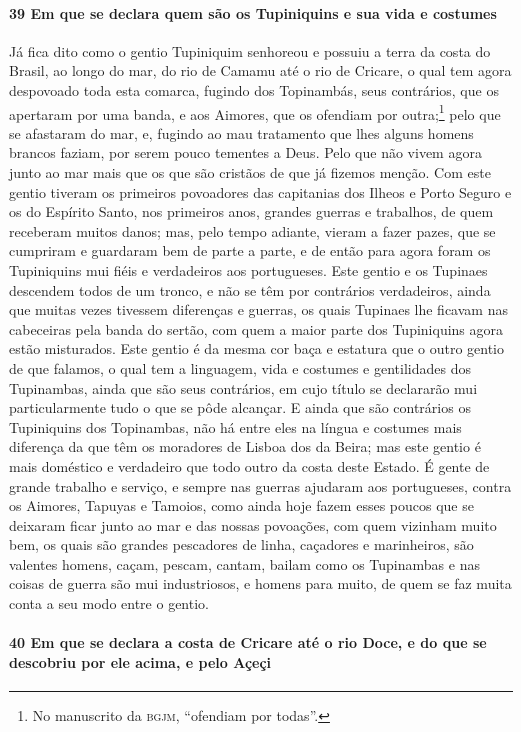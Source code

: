 \paragraph{39 Em que se declara quem são os Tupiniquins e sua vida e costumes}

Já fica dito como o gentio Tupiniquim senhoreou e possuiu a terra da costa do Brasil, ao
longo do mar, do rio de Camamu até o rio de Cricare, o qual tem agora despovoado toda esta
comarca, fugindo dos Topinambás, seus contrários, que os apertaram por uma banda, e aos
Aimores, que os ofendiam por outra;\footnote{ No manuscrito da \textsc{bgjm}, ``ofendiam
por todas''.} pelo que se afastaram do mar, e, fugindo ao mau tratamento que lhes alguns
homens brancos faziam, por serem pouco tementes a Deus. Pelo que não vivem agora junto ao
mar mais que os que são cristãos de que já fizemos menção. Com este gentio tiveram os
primeiros povoadores das capitanias dos Ilheos e Porto Seguro e os do Espírito Santo, nos
primeiros anos, grandes guerras e trabalhos, de quem receberam muitos danos; mas, pelo
tempo adiante, vieram a fazer pazes, que se cumpriram e guardaram bem de parte a parte, e
de então para agora foram os Tupiniquins mui fiéis e verdadeiros aos portugueses. Este
gentio e os Tupinaes descendem todos de um tronco, e não se têm por contrários
verdadeiros, ainda que muitas vezes tivessem diferenças e guerras, os quais Tupinaes lhe
ficavam nas cabeceiras pela banda do sertão, com quem a maior parte dos Tupiniquins agora
estão misturados. Este gentio é da mesma cor baça e estatura que o outro gentio de que
falamos, o qual tem a linguagem, vida e costumes e gentilidades dos Tupinambas, ainda que
são seus contrários, em cujo título se declararão mui particularmente tudo o que se pôde
alcançar. E ainda que são contrários os Tupiniquins dos Topinambas, não há entre eles na
língua e costumes mais diferença da que têm os moradores de Lisboa dos da Beira; mas este
gentio é mais doméstico e verdadeiro que todo outro da costa deste Estado. É gente de
grande trabalho e serviço, e sempre nas guerras ajudaram aos portugueses, contra os
Aimores, Tapuyas e Tamoios, como ainda hoje fazem esses poucos que se deixaram ficar junto
ao mar e das nossas povoações, com quem vizinham muito bem, os quais são grandes
pescadores de linha, caçadores e marinheiros, são valentes homens, caçam, pescam, cantam,
bailam como os Tupinambas e nas coisas de guerra são mui industriosos, e homens para
muito, de quem se faz muita conta a seu modo entre o gentio.

\paragraph{40 Em que se declara a costa de Cricare até o rio Doce, e do que se descobriu
por ele acima, e pelo Açeçi}

